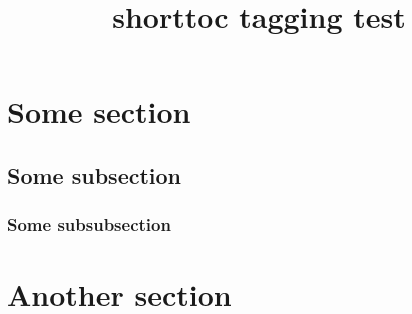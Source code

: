 \documentclass{article}
\title{shorttoc tagging test}
\begin{document}
\tableofcontents

\section{Some section}
\subsection{Some subsection}
\subsubsection{Some subsubsection}

\section{Another section}
\end{document}
